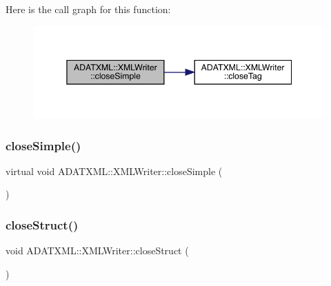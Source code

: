 Here is the call graph for this function\+:\nopagebreak
\begin{figure}[H]
\begin{center}
\leavevmode
\includegraphics[width=345pt]{da/da7/classADATXML_1_1XMLWriter_ab8cdb27adc2f4d3b893b8234d13f9e70_cgraph}
\end{center}
\end{figure}
\mbox{\label{classADATXML_1_1XMLWriter_a7141f35d34f4d15bbaf15d9124a4e054}} 
\subsubsection{\texorpdfstring{closeSimple()}{closeSimple()}\hspace{0.1cm}{\footnotesize\ttfamily [2/2]}}
{\footnotesize\ttfamily virtual void A\+D\+A\+T\+X\+M\+L\+::\+X\+M\+L\+Writer\+::close\+Simple (\begin{DoxyParamCaption}{ }\end{DoxyParamCaption})\hspace{0.3cm}{\ttfamily [virtual]}}

\mbox{\label{classADATXML_1_1XMLWriter_ade5512a07806893fe3aaebb897580569}} 
\subsubsection{\texorpdfstring{closeStruct()}{closeStruct()}\hspace{0.1cm}{\footnotesize\ttfamily [1/2]}}
{\footnotesize\ttfamily void A\+D\+A\+T\+X\+M\+L\+::\+X\+M\+L\+Writer\+::close\+Struct (\begin{DoxyParamCaption}{ }\end{DoxyParamCaption})\hspace{0.3cm}{\ttfamily [virtual]}}



